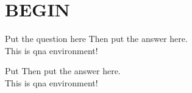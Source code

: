 \documentclass{spaexp}
\begin{document}
     
\maketitle
\section{BEGIN}

\begin{qna}{Put the question here}
    Then put the answer here.\\
    This is qna environment!
\end{qna}
\begin{qna}{Put}
    Then put the answer here.\\
    This is qna environment!
\end{qna}
\end{document}
